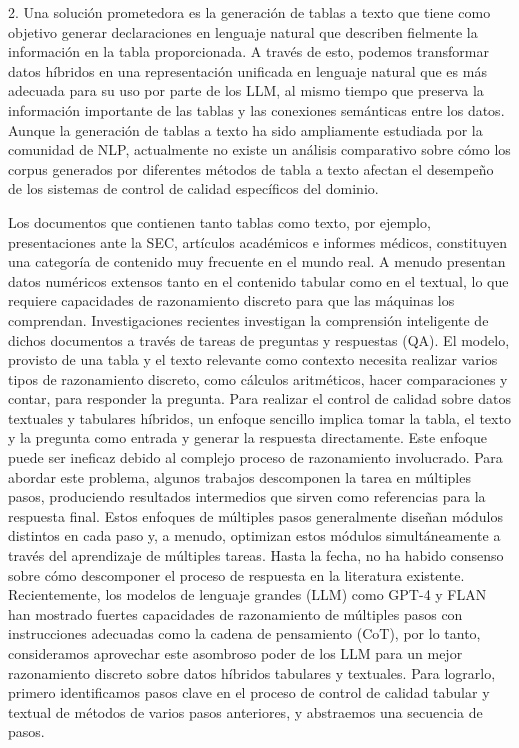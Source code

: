 2.	Una solución prometedora es la generación de tablas a texto que tiene como objetivo generar declaraciones en lenguaje natural que describen fielmente la información en la tabla proporcionada. A través de esto, podemos transformar datos híbridos en una representación unificada en lenguaje natural que es más adecuada para su uso por parte de los LLM, al mismo tiempo que preserva la información importante de las tablas y las conexiones semánticas entre los datos. 
Aunque la generación de tablas a texto ha sido ampliamente estudiada por la comunidad de NLP, actualmente no existe un análisis comparativo sobre cómo los corpus generados por diferentes métodos de tabla a texto afectan el desempeño de los sistemas de control de calidad específicos del dominio.

Los documentos que contienen tanto tablas como texto, por ejemplo, presentaciones ante la SEC, artículos académicos e informes médicos, constituyen una categoría de contenido muy frecuente en el mundo real. A menudo presentan datos numéricos extensos tanto en el contenido tabular como en el textual, lo que requiere capacidades de razonamiento discreto para que las máquinas los comprendan. Investigaciones recientes investigan la comprensión inteligente de dichos documentos a través de tareas de preguntas y respuestas (QA). El modelo, provisto de una tabla y el texto relevante como contexto necesita realizar varios tipos de razonamiento discreto, como cálculos aritméticos, hacer comparaciones y contar, para responder la pregunta. Para realizar el control de calidad sobre datos textuales y tabulares híbridos, un enfoque sencillo implica tomar la tabla, el texto y la pregunta como entrada y generar la respuesta directamente. Este enfoque puede ser ineficaz debido al complejo proceso de razonamiento involucrado. Para abordar este problema, algunos trabajos descomponen la tarea en múltiples pasos, produciendo resultados intermedios que sirven como referencias para la respuesta final. Estos enfoques de múltiples pasos generalmente diseñan módulos distintos en cada paso y, a menudo, optimizan estos módulos simultáneamente a través del aprendizaje de múltiples tareas. Hasta la fecha, no ha habido consenso sobre cómo descomponer el proceso de respuesta en la literatura existente.
Recientemente, los modelos de lenguaje grandes (LLM) como GPT-4 y FLAN han mostrado fuertes capacidades de razonamiento de múltiples pasos con instrucciones adecuadas como la cadena de pensamiento (CoT), por lo tanto, consideramos aprovechar este asombroso poder de los LLM para un mejor razonamiento discreto sobre datos híbridos tabulares y textuales. Para lograrlo, primero identificamos pasos clave en el proceso de control de calidad tabular y textual de métodos de varios pasos anteriores, y abstraemos una secuencia de pasos.
